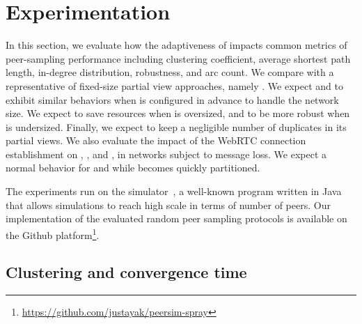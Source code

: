 \newcommand\SCALE{0.8}

\section{Experimentation}
\label{sec:experimentation}


In this section, we evaluate how the adaptiveness of \SPRAY impacts common
metrics of peer-sampling performance including clustering coefficient, average
shortest path length, in-degree distribution, robustness, and arc count. We
compare \SPRAY with a representative of fixed-size partial view approaches,
namely \CYCLON. We expect \SPRAY and \CYCLON to exhibit similar behaviors when
\CYCLON is configured in advance to handle the network size. We expect \SPRAY to
save resources when \CYCLON is oversized, and to be more robust when \CYCLON is
undersized. Finally, we expect \SPRAY to keep a negligible number of duplicates
in its partial views. We also evaluate the impact of the WebRTC connection
establishment on \CYCLON, \SCAMP, and \SPRAY, in networks subject to message
loss.  We expect a normal behavior for \CYCLON and \SPRAY while \SCAMP becomes
quickly partitioned.

The experiments run on the \PEERSIM simulator~\cite{montresor2009peersim}, a
well-known program written in Java that allows simulations to reach high scale
in terms of number of peers. Our implementation of the evaluated random peer
sampling protocols is available on the Github
platform\footnote{\url{https://github.com/justayak/peersim-spray}}.


\subsection{Clustering and convergence time}

